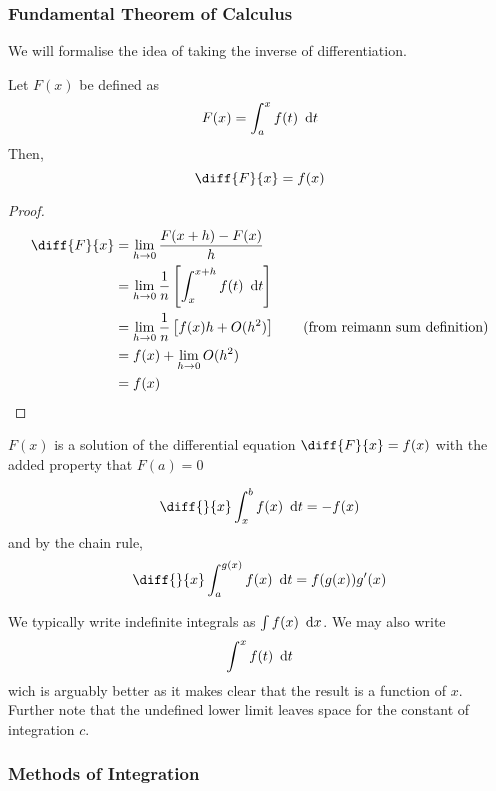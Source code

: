 \documentclass{article}
\begin{document}
\subsubsection{Fundamental Theorem of Calculus}
We will formalise the idea of taking the inverse of differentiation.

\begin{thm}[FTC]
    Let $F(x)$ be defined as
    \[
        F(x) = \int_{a}^{x}{f(t) \ \diffd t}  
    \]
    Then,
    \[
        \diff{F}{x} = f(x)
    \]
\end{thm}
\begin{proof}
    \begin{align*}
        \diff{F}{x} &= \lim_{h \rightarrow 0}\frac{F(x + h) - F(x)}{h} \\
        &= \lim_{h \rightarrow 0}\frac{1}{n}\sqbkt{\int_{x}^{x+h}{f(t) \ \diffd t}} \\
        &= \lim_{h \rightarrow 0}\frac{1}{n}\sqbkt{f(x)h + O(h^2)} \tag{from reimann sum definition} \\
        &= f(x) + \lim_{h \rightarrow 0}O(h^2) \\
        &= f(x)
    \end{align*}
\end{proof}

\begin{remark}
    $F(x)$ is a solution of the differential equation $\diff{F}{x} = f(x)$ with the added property that $F(a) = 0$
\end{remark}

\begin{cor}
\[
    \diff{}{x}\int_{x}^{b}{f(x) \ \diffd t} = -f(x)
\]
and by the chain rule, 
\[
    \diff{}{x}\int_{a}^{g(x)}{f(x) \ \diffd t} = f(g(x))g'(x)
\]
\end{cor}

\begin{notation}
    We typically write indefinite integrals as $\int{f(x) \ \mathop{}\!\mathrm{d}x}$. We may also write
    \[
        \int^{x}{f(t) \ \mathop{}\!\mathrm{d} t}    
    \]
    wich is arguably better as it makes clear that the result is a function of $x$. Further note that the undefined lower limit leaves space for the constant of integration $c$.
\end{notation}

\subsubsection{Methods of Integration}
\end{document}
